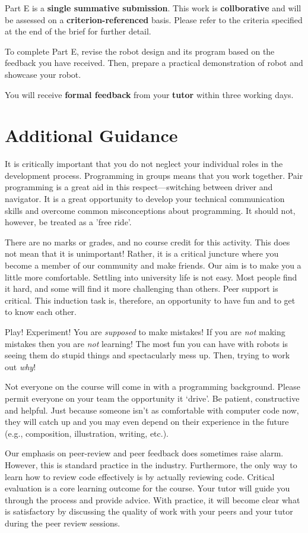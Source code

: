 \documentclass{fal_assignment}
\begin{document}
Part E is a \textbf{single summative submission}. This work is \textbf{collborative} and will be assessed on a \textbf{criterion-referenced} basis.  Please refer to the criteria specified at the end of the brief for further detail.

To complete Part E, revise the robot design and its program based on the feedback you have received. Then, prepare a practical demonstration of robot and showcase your robot.

You will receive \textbf{formal feedback} from your \textbf{tutor} within three working days.

\section*{Additional Guidance}

It is critically important that you do not neglect your individual roles in the development process. Programming in groups means that you work together. Pair programming is a great aid in this respect---switching between driver and navigator. It is a great opportunity to develop your technical communication skills and overcome common misconceptions about programming. It should not, however, be treated as a 'free ride'. 

There are no marks or grades, and no course credit for this activity. This does not mean that it is unimportant! Rather, it is a critical juncture where you become a member of our community and make friends. Our aim is to make you a little more comfortable. Settling into university life is not easy. Most people find it hard, and some will find it more challenging than others. Peer support is critical. This induction task is, therefore, an opportunity to have fun and to get to know each other. 

Play! Experiment! You are \textit{supposed} to make mistakes! If you are \textit{not} making mistakes then you are \textit{not} learning! The most fun you can have with robots is seeing them do stupid things and spectacularly mess up. Then, trying to work out \textit{why}!

Not everyone on the course will come in with a programming background. Please permit everyone on your team the opportunity it `drive'. Be patient, constructive and helpful. Just because someone isn't as comfortable with computer code now, they will catch up and you may even depend on their experience in the future (e.g., composition, illustration, writing, etc.).

Our emphasis on peer-review and peer feedback does sometimes raise alarm. However, this is standard practice in the industry. Furthermore, the only way to learn how to review code effectively is by actually reviewing code. Critical evaluation is a core learning outcome for the course. Your tutor will guide you through the process and provide advice. With practice, it will become clear what is satisfactory by discussing the quality of work with your peers and your tutor during the peer review sessions. 
\end{document}
